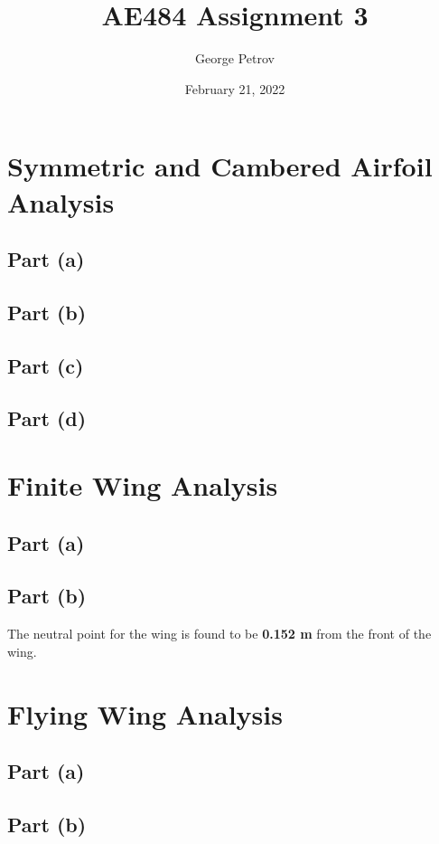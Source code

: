 

\title{AE484 Assignment 3}
\author{George Petrov}
\date{February 21, 2022}



\maketitle
\begin{singlespace}
\section{Symmetric and Cambered Airfoil Analysis}
\subsection{Part (a)}
\subsection{Part (b)}
\subsection{Part (c)}
\subsection{Part (d)}

\section{Finite Wing Analysis}
\subsection{Part (a)}
\subsection{Part (b)}
The neutral point for the wing is found to be \textbf{0.152 m} from the front of the wing.

\section{Flying Wing Analysis}
\subsection{Part (a)}
\subsection{Part (b)}
\end{singlespace}
